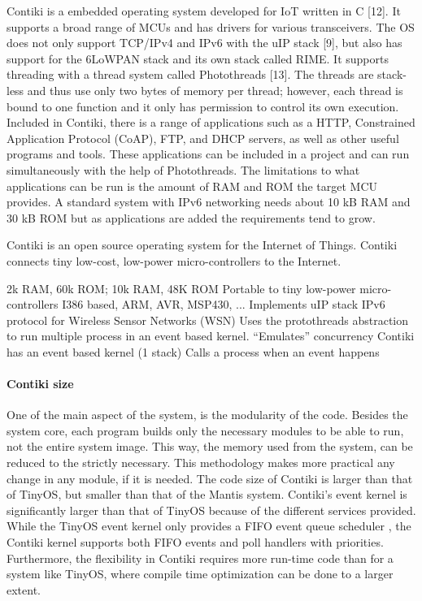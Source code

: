 Contiki is a embedded operating system developed for IoT written in C [12].
It supports a broad range of MCUs and has drivers for various transceivers.
The OS does not only support TCP/IPv4 and IPv6 with the uIP stack [9],
	but also has support for the 6LoWPAN stack and its own stack called RIME.
It supports threading with a thread system called Photothreads [13].
The threads are stack-less and thus use only two bytes of memory per thread;
	however,
	each thread is bound to one function and it only has permission to control its own execution.
Included in Contiki,
	there is a range of applications such as a HTTP,
	Constrained Application Protocol (CoAP),
	FTP,
	and DHCP servers,
	as well as other useful programs and tools.
These applications can be included in a project and can run simultaneously with the help of Photothreads.
The limitations to what applications can be run is the amount of RAM and ROM the target MCU provides.
A standard system with IPv6 networking needs about 10 kB RAM and 30 kB ROM but as applications are added the requirements tend to grow.


Contiki is an open source operating system for the Internet of Things.
Contiki connects tiny low-cost,
	low-power micro-controllers to the Internet.

2k RAM, 60k ROM; 10k RAM, 48K ROM
Portable to tiny low-power micro-controllers
I386 based, ARM, AVR, MSP430, ...
Implements uIP stack
IPv6 protocol for Wireless Sensor Networks (WSN)
Uses the protothreads abstraction to run multiple process in an event based
kernel.
“Emulates” concurrency
Contiki has an event based kernel (1 stack)
Calls a process when an event happens

\paragraph*{Contiki size}

One of the main aspect of the system,
	is the modularity of the code.
Besides the system core,
	each program builds only the necessary modules to be able to run,
	not the entire system image.
This way,
	the memory used from the system,
	can be reduced to the strictly necessary.
This methodology makes more practical any change in any module,
	if it is needed.
The code size of Contiki is larger than that of TinyOS,
	but smaller than that of the Mantis system.
Contiki's event kernel is significantly larger than that of TinyOS because of the different services provided.
While the TinyOS event kernel only provides a FIFO event queue scheduler ,
	the Contiki kernel supports both FIFO events and poll handlers with priorities.
Furthermore,
	the flexibility in Contiki requires more run-time code than for a system like TinyOS,
	where compile time optimization can be done to a larger extent.

